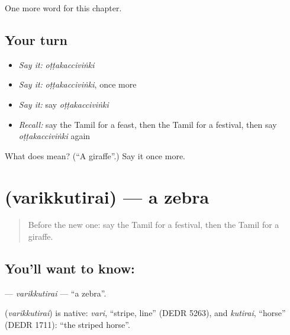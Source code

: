 \begin{grammarlens}[title={What you've built}]
One more word for this chapter.
\end{grammarlens}

\subsection*{Your turn}
\begin{itemize}
\raggedright
  \item \emph{Say it:} \emph{oṭṭakacciviṅki}
  \item \emph{Say it:} \emph{oṭṭakacciviṅki}, once more
  \item \emph{Say it:} say \emph{oṭṭakacciviṅki}
  \item \emph{Recall:} say the Tamil for a feast, then the Tamil for a festival, then say \emph{oṭṭakacciviṅki} again
\end{itemize}

\begin{tcolorbox}[breakable,colback=teal!4,colframe=teal!35!black,title={Before you move on}]
What does  mean? (\textquotedblleft{}A giraffe\textquotedblright{}.) Say it once more.
\end{tcolorbox}
\section[\texorpdfstring{\ta{வரிக்குதிரை} (varikkutirai)}{வரிக்குதிரை (varikkutirai)}]{ (varikkutirai) — a zebra}

\label{lesson:TA-C218-varikkutirai}



\begin{quote}
Before the new one: say the Tamil for a festival, then the Tamil for a giraffe.
\end{quote}

\subsection*{You'll want to know: }
\textbf{} — \emph{varikkutirai} — \textquotedblleft{}a zebra\textquotedblright{}.

\begin{cousinweb}
\textbf{} (\emph{varikkutirai}) is native: \emph{vari}, \textquotedblleft{}stripe, line\textquotedblright{} (DEDR 5263), and \emph{kutirai}, \textquotedblleft{}horse\textquotedblright{} (DEDR 1711): \textquotedblleft{}the striped horse\textquotedblright{}.
\end{cousinweb}

